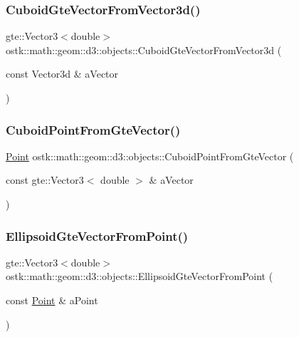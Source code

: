 \subsubsection{\texorpdfstring{Cuboid\+Gte\+Vector\+From\+Vector3d()}{CuboidGteVectorFromVector3d()}}
{\footnotesize\ttfamily gte\+::\+Vector3$<$double$>$ ostk\+::math\+::geom\+::d3\+::objects\+::\+Cuboid\+Gte\+Vector\+From\+Vector3d (\begin{DoxyParamCaption}\item[{const Vector3d \&}]{a\+Vector }\end{DoxyParamCaption})}

\mbox{\label{namespaceostk_1_1math_1_1geom_1_1d3_1_1objects_a1c389ebd859f427f97fedccb03d41cbb}} 
\subsubsection{\texorpdfstring{Cuboid\+Point\+From\+Gte\+Vector()}{CuboidPointFromGteVector()}}
{\footnotesize\ttfamily \hyperlink{classostk_1_1math_1_1geom_1_1d3_1_1objects_1_1_point}{Point} ostk\+::math\+::geom\+::d3\+::objects\+::\+Cuboid\+Point\+From\+Gte\+Vector (\begin{DoxyParamCaption}\item[{const gte\+::\+Vector3$<$ double $>$ \&}]{a\+Vector }\end{DoxyParamCaption})}

\mbox{\label{namespaceostk_1_1math_1_1geom_1_1d3_1_1objects_a22a1f8043bef37b2f367019b676464de}} 
\subsubsection{\texorpdfstring{Ellipsoid\+Gte\+Vector\+From\+Point()}{EllipsoidGteVectorFromPoint()}}
{\footnotesize\ttfamily gte\+::\+Vector3$<$double$>$ ostk\+::math\+::geom\+::d3\+::objects\+::\+Ellipsoid\+Gte\+Vector\+From\+Point (\begin{DoxyParamCaption}\item[{const \hyperlink{classostk_1_1math_1_1geom_1_1d3_1_1objects_1_1_point}{Point} \&}]{a\+Point }\end{DoxyParamCaption})}

